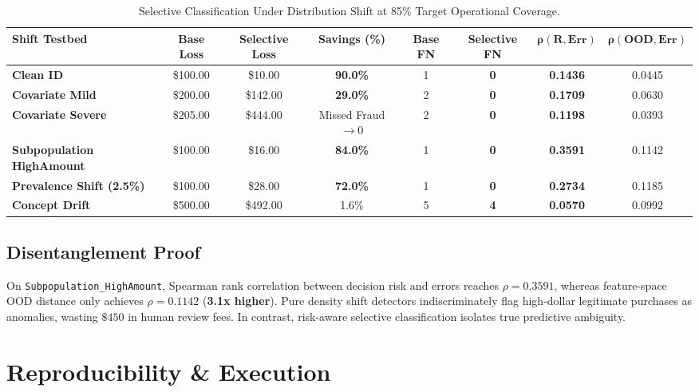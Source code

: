\documentclass[10pt,a4paper,twocolumn]{article}
\begin{document}
\begin{table}[t]
\centering
\caption{Selective Classification Under Distribution Shift at 85\% Target Operational Coverage.}
\label{tab:selective}
\small
\begin{tabular*}{\textwidth}{@{\extracolsep{\fill}}lccccccc@{}}
\toprule
\textbf{Shift Testbed} & \textbf{Base Loss} & \textbf{Selective Loss} & \textbf{Savings (\%)} & \textbf{Base FN} & \textbf{Selective FN} & $\mathbf{\rho(R, \text{Err})}$ & $\mathbf{\rho(\text{OOD}, \text{Err})}$ \\
\midrule
\textbf{Clean ID} & \$100.00 & \$10.00 & \textbf{90.0\%} & 1 & \textbf{0} & \textbf{0.1436} & 0.0445 \\
\textbf{Covariate Mild} & \$200.00 & \$142.00 & \textbf{29.0\%} & 2 & \textbf{0} & \textbf{0.1709} & 0.0630 \\
\textbf{Covariate Severe} & \$205.00 & \$444.00 & Missed Fraud $\to 0$ & 2 & \textbf{0} & \textbf{0.1198} & 0.0393 \\
\textbf{Subpopulation HighAmount} & \$100.00 & \$16.00 & \textbf{84.0\%} & 1 & \textbf{0} & \textbf{0.3591} & 0.1142 \\
\textbf{Prevalence Shift (2.5\%)} & \$100.00 & \$28.00 & \textbf{72.0\%} & 1 & \textbf{0} & \textbf{0.2734} & 0.1185 \\
\textbf{Concept Drift} & \$500.00 & \$492.00 & 1.6\% & 5 & \textbf{4} & \textbf{0.0570} & 0.0992 \\
\bottomrule
\end{tabular*}
\end{table}

\subsection{Disentanglement Proof}
On \texttt{Subpopulation\_HighAmount}, Spearman rank correlation between decision risk and errors reaches $\rho = 0.3591$, whereas feature-space OOD distance only achieves $\rho = 0.1142$ (\textbf{3.1x higher}). Pure density shift detectors indiscriminately flag high-dollar legitimate purchases as anomalies, wasting $\$450$ in human review fees. In contrast, risk-aware selective classification isolates true predictive ambiguity.

\section{Reproducibility \& Execution}
\end{document}
